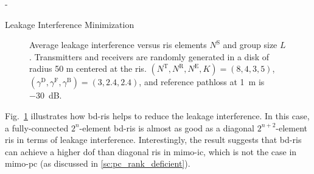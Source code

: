\documentclass[journal]{IEEEtran}
\begin{document}
\begin{section}{-}
\begin{subsection}{Leakage Interference Minimization}
		\begin{figure}[!t]
			\centering
			\resizebox{0.65\columnwidth}{!}{
				
			}
			\caption{Average leakage interference versus \gls{ris} elements $N^\mathrm{S}$ and group size $L$. Transmitters and receivers are randomly generated in a disk of radius 50 m centered at the \gls{ris}. $(N^\mathrm{T}, N^\mathrm{R}, N^\mathrm{E}, K) = (8, 4, 3, 5)$, $(\gamma^\mathrm{D}, \gamma^\mathrm{F}, \gamma^\mathrm{B}) = (3, 2.4, 2.4)$, and reference pathloss at \qty{1}{\meter} is \qty{-30}{\dB}.}
			\label{sm:ic_interference_sx}
		\end{figure}
		Fig.~\ref{sm:ic_interference_sx} illustrates how \gls{bd}-\gls{ris} helps to reduce the leakage interference.
		In this case, a fully-connected $2^n$-element \gls{bd}-\gls{ris} is almost as good as a diagonal $2^{n+2}$-element \gls{ris} in terms of leakage interference.
		Interestingly, the result suggests that \gls{bd}-\gls{ris} can achieve a higher \gls{dof} than diagonal \gls{ris} in \gls{mimo}-\gls{ic}, which is not the case in \gls{mimo}-\gls{pc} (as discussed in \ref{sc:pc_rank_deficient}).
	\end{subsection}


\end{section}
\end{document}
